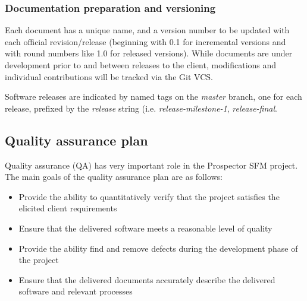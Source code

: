 \documentclass[12pt]{article}
\begin{document}
\subsubsection{Documentation preparation and versioning}

Each document has a unique name, and a version number to be updated with each official revision/release (beginning with 0.1 for incremental versions and with round numbers like 1.0 for released versions). While documents are under development prior to and between releases to the client, modifications and individual contributions will be tracked via the Git VCS.

Software releases are indicated by named tags on the \textit{master} branch, one for each release, prefixed by the \textit{release} string (i.e. \textit{release-milestone-1}, \textit{release-final}. 

\subsection{Quality assurance plan}\label{QA}

Quality assurance (QA) has very important role in the Prospector SFM project. The main goals of the quality assurance plan are as follows:

\begin{itemize}{}
\item Provide the ability to quantitatively verify that the project satisfies the elicited client requirements
\item Ensure that the delivered software meets a reasonable level of quality
\item Provide the ability find and remove defects during the development phase of the project
\item Ensure that the delivered documents accurately describe the delivered software and relevant processes
\end{itemize}
\end{document}
